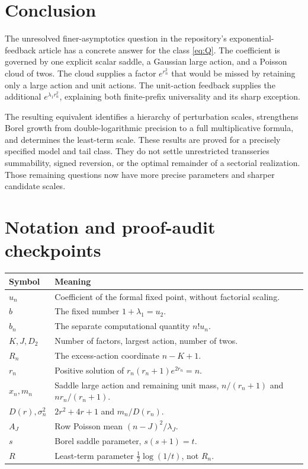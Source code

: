 \documentclass[11pt,a4paper]{article}
\theoremstyle{definition}
\numberwithin{equation}{section}
\begin{document}
\section{Conclusion}
The unresolved finer-asymptotics question in the repository's
exponential-feedback article has a concrete answer for the class
\eqref{eq:Q}. The coefficient is governed by one explicit scalar saddle,
a Gaussian large action, and a Poisson cloud of twos. The cloud supplies a
factor \(e^{r_n^2}\) that would be missed by retaining only a large action
and unit actions. The unit-action feedback supplies the additional
\(e^{\lambda_1r_n^2}\), explaining both finite-prefix universality and
its sharp exception.

The resulting equivalent identifies a hierarchy of perturbation scales,
strengthens Borel growth from double-logarithmic precision to a full
multiplicative formula, and determines the least-term scale. These results
are proved for a precisely specified model and tail class. They do not
settle unrestricted transseries summability, signed reversion, or the
optimal remainder of a sectorial realization. Those remaining questions
now have more precise parameters and sharper candidate scales.

\appendix
\section{Notation and proof-audit checkpoints}
\label{app:audit}
\begin{center}
\small
\begin{tabular}{@{}p{}p{}@{}}
\toprule
Symbol & Meaning\\
\midrule
\(u_n\) & Coefficient of the formal fixed point, without factorial scaling.\\
\(b\) & The fixed number \(1+\lambda_1=u_2\).\\
\(b_n\) & The separate computational quantity \(n!u_n\).\\
\(K,J,D_2\) & Number of factors, largest action, number of twos.\\
\(R_n\) & The excess-action coordinate \(n-K+1\).\\
\(r_n\) & Positive solution of \(r_n(r_n+1)e^{2r_n}=n\).\\
\(x_n,m_n\) & Saddle large action and remaining unit mass,
\(n/(r_n+1)\) and \(nr_n/(r_n+1)\).\\
\(D(r),\sigma_n^2\) & \(2r^2+4r+1\) and \(m_n/D(r_n)\).\\
\(A_J\) & Row Poisson mean \((n-J)^2/\lambda_J\).\\
\(s\) & Borel saddle parameter, \(s(s+1)=t\).\\
\(R\) & Least-term parameter \(\tfrac12\log(1/t)\), not \(R_n\).\\
\bottomrule
\end{tabular}
\end{center}
\end{document}
